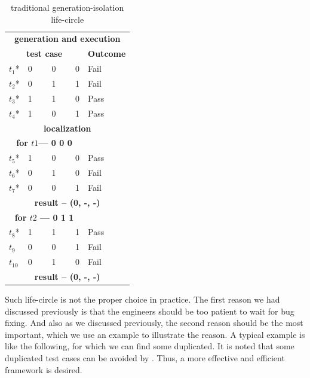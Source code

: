 \documentclass{sig-alternate}
\begin{document}
\begin{table}[h]
\caption{traditional generation-isolation life-circle}
\label{tradition-gi}
\center
\begin{tabular}{llllll}
\multicolumn{6}{c}{\bfseries generation and execution} \\
\multicolumn{5}{c}{\bfseries test case} & \bfseries Outcome \\
 $t_{1}$* & \multicolumn{4}{l}{0 \ \ \ \ 0 \ \ \ \  0 } & Fail \\
 $t_{2}$* & \multicolumn{4}{l}{0 \ \ \ \ 1 \ \ \ \  1 } & Fail \\
 $t_{3}$* & \multicolumn{4}{l}{1 \ \ \ \ 1 \ \ \ \  0 } & Pass \\
 $t_{4}$* & \multicolumn{4}{l}{1 \ \ \ \ 0 \ \ \ \  1 } & Pass \\   
 \hline
\multicolumn{6}{c}{\bfseries localization}  \\
\multicolumn{5}{c}{\bfseries for $t1$--- 0 0 0} &  \\
$t_{5}$* &\multicolumn{4}{l}{1  \ \ \ \  0 \ \ \ \  0 }& Pass \\
$t_{6}$* &\multicolumn{4}{l}{0  \ \ \ \  1 \ \ \ \  0 } & Fail \\
$t_{7}$* &\multicolumn{4}{l}{0  \ \ \ \  0 \ \ \ \  1 } & Fail \\
\multicolumn{6}{c}{\bfseries result --  (0, -, -)}  \\
\multicolumn{5}{c}{\bfseries for $t2$ --- 0 1 1} &  \\
$t_{8}$* &\multicolumn{4}{l}{1  \ \ \ \  1 \ \ \ \  1 }& Pass \\
$t_{9}$ &\multicolumn{4}{l}{0  \ \ \ \  0 \ \ \ \  1 } & Fail \\
$t_{10}$ &\multicolumn{4}{l}{0  \ \ \ \  1 \ \ \ \  0 } & Fail \\
\multicolumn{6}{c}{\bfseries result --  (0, -, -)}  \\
\end{tabular}
\end{table}

Such life-circle is not the proper choice in practice. The first reason we had discussed previously is that the engineers should be too patient to wait for bug fixing. And also as we discussed previously, the second reason should be the most important, which we use an example to illustrate the reason. A typical example is like the following,
for which we can find some duplicated. It is noted that some duplicated test cases can be avoided by . Thus, a more effective and efficient framework is desired.
\end{document}
